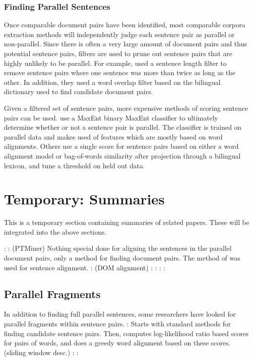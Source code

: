 \subsubsection{Finding Parallel Sentences}
Once comparable document pairs have been identified, most comparable corpora
extraction methods will independently judge each sentence pair as parallel or
non-parallel. Since there is often a very large amount of document pairs and
thus potential sentence pairs, filters are used to prune out sentence pairs that
are highly unlikely to be parallel. For example, \citet{Munteanu05} used a
sentence length filter to remove sentence pairs where one sentence was more than
twice as long as the other. In addition, they used a word overlap filter based
on the bilingual dictionary used to find candidate document pairs.

Given a filtered set of sentence pairs, more expensive methods of scoring
sentence pairs can be used. \citet{Munteanu05} use a MaxEnt binary MaxEnt
classifier to ultimately determine whether or not a sentence pair is parallel.
The classifier is trained on parallel data and makes used of features which are
mostly based on word alignments. Others
\cite{Fung04a,Fung04b,Tillmann09a,Tillmann09b} use a single score for sentence
pairs based on either a word alignment model or bag-of-words similarity after
projection through a bilingual lexicon, and tune a threshold on held out data.

\section{Temporary: Summaries}
This is a temporary section containing summaries of related papers. These will
be integrated into the above sections.

\citet{Dagan93}:
\citet{Chen00}: (PTMiner) Nothing special done for aligning the sentences in the 
parallel document pairs, only a method for finding document pairs. The method of
\citet{Simard93} was used for sentence alignment.
\citet{Shi06}: (DOM alignment)
\citet{Abdul-Rauf09}:
\citet{Ambati10}:
\citet{Ture11}:
\citet{Ture12}:

\subsection{Parallel Fragments}
In addition to finding full parallel sentences, some researchers have looked for
parallel fragments within sentence pairs.
\citet{Munteanu06}: Starts with standard methods for finding candidate sentence
pairs. Then, computes log-likelihood ratio based scores for pairs of words, and
does a greedy word alignment based on these scores. (sliding window desc.)
\citet{Quirk07}:
\citet{Riesa12}:
